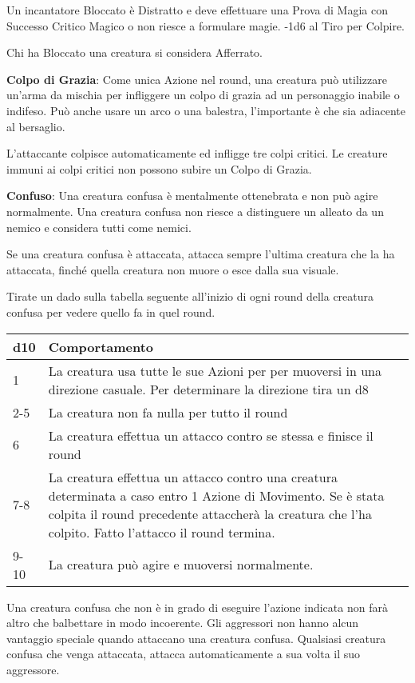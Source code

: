 \begin{multicols}{2}
Un incantatore Bloccato è Distratto e deve effettuare una Prova di Magia con Successo Critico Magico o non riesce a formulare magie. -1d6 al Tiro per Colpire.

Chi ha Bloccato una creatura si considera Afferrato.

\textbf{Colpo di Grazia}: Come unica Azione nel round, una creatura può utilizzare un'arma da mischia per infliggere un colpo di grazia ad un personaggio inabile o indifeso. Può anche usare un arco o una balestra, l'importante è che sia adiacente al bersaglio.

L'attaccante colpisce automaticamente ed infligge tre colpi critici. Le creature immuni ai colpi critici non possono subire un Colpo di Grazia.

\textbf{Confuso}: \hypertarget{confusionecondizione}{}Una creatura confusa è mentalmente ottenebrata e non può agire normalmente. Una creatura confusa non riesce a distinguere un alleato da un nemico e considera tutti come nemici.

Se una creatura confusa è attaccata, attacca sempre l'ultima creatura che la ha attaccata, finché quella creatura non muore o esce dalla sua visuale.

Tirate un dado sulla tabella seguente all'inizio di ogni round della creatura confusa per vedere quello fa in quel round.

\medskip

\noindent\begin{tabularx}{\linewidth}{l|X}
	\toprule
\textbf{d10} & \textbf{Comportamento} \\
\toprule
1 & La creatura usa tutte le sue Azioni per per muoversi in una direzione casuale. Per determinare la direzione tira un d8\\
2-5 & La creatura non fa nulla per tutto il round\\
6 &  La creatura effettua un attacco contro se stessa e finisce il round\\
7-8 & La creatura effettua un attacco contro una creatura determinata a caso entro 1 Azione di Movimento. Se è stata colpita il round precedente attaccherà la creatura che l'ha colpito. Fatto l'attacco il round termina.\\
9-10 & La creatura può agire e muoversi normalmente.
\end{tabularx}

\medskip

Una creatura confusa che non è in grado di eseguire l'azione indicata non farà altro che balbettare in modo incoerente. Gli aggressori non hanno alcun vantaggio speciale quando attaccano una creatura confusa. Qualsiasi creatura confusa che venga attaccata, attacca automaticamente a sua volta il suo aggressore.


\end{multicols}
